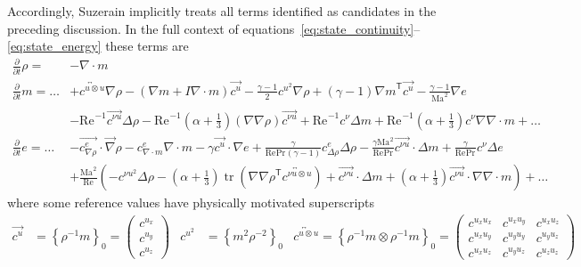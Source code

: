 \documentclass[letterpaper,11pt,nointlimits,reqno,draft]{amsbook}
\newcommand{\trans}[1]{{#1}^{\ensuremath{\mathsf{T}}}}
\newcommand{\Mach}[1][]{\ensuremath{\mbox{Ma}_{#1}}}
\newcommand{\Reynolds}[1][]{\ensuremath{\mbox{Re}_{#1}}}
\newcommand{\Prandtl}[1][]{\ensuremath{\mbox{Pr}_{#1}}}
\newcommand{\reference}[1]{\ensuremath{\left\{#1\right\}_{0}}}
\DeclareMathOperator{\trace}{tr}
\begin{document}
Accordingly, Suzerain implicitly treats all terms identified as candidates
in the preceding discussion.  In the full context of
equations~\eqref{eq:state_continuity}--\eqref{eq:state_energy} these terms are
\begin{align}
  \frac{\partial}{\partial{}t} \rho{} = &-\nabla\cdot{}m
\\
  \frac{\partial}{\partial{}t} m = \dots
   &+ \overleftrightarrow{c^{u\otimes{}u}} \nabla\rho
    - \left(\nabla{}m+I\nabla\cdot{}m\right)\overrightarrow{c^u}
    - \frac{\gamma-1}{2} c^{u^2} \nabla\rho
    + \left(\gamma-1\right)\trans{\nabla{}m} \overrightarrow{c^u}
    - \frac{\gamma-1}{\Mach^2}\nabla{}e
\\
   &- \Reynolds^{-1} \overrightarrow{c^{\nu{}u}} \Delta\rho
    - \Reynolds^{-1} \left(\alpha+\frac{1}{3}\right) \left(\nabla\nabla\rho\right) \overrightarrow{c^{\nu{}u}}
    + \Reynolds^{-1} c^{\nu} \Delta{}m
    + \Reynolds^{-1} \left(\alpha+\frac{1}{3}\right)c^{\nu} \nabla\nabla\cdot{}m
    + \dots
\\
  \frac{\partial}{\partial{}t} e = \dots
   &- \overrightarrow{c^{e}_{\nabla\rho}} \cdot\vec{\nabla}\rho
    - c^{e}_{\nabla\cdot{}m} \nabla\cdot{}m
    - \gamma \overrightarrow{c^u}\cdot\nabla{}e
    + \frac{\gamma}{\Reynolds\Prandtl\left(\gamma-1\right)}
      c^{e}_{\Delta\rho} \Delta\rho
    - \frac{\gamma\Mach^{2}}{\Reynolds\Prandtl}
      \overrightarrow{c^{\nu{}u}}\cdot\Delta{}m
    + \frac{\gamma}{\Reynolds\Prandtl}c^{\nu}\Delta{}e
\\
   &+ \frac{\Mach^2}{\Reynolds}\left(
       - c^{\nu{}u^2}\Delta\rho
       - \left(\alpha+\frac{1}{3}\right)
         \trace\left(\trans{\nabla\nabla\rho}
                     \overleftrightarrow{c^{\nu{}u\otimes{}u}}\right)
       + \overrightarrow{c^{\nu{}u}}\cdot\Delta{}m
       + \left(\alpha+\frac{1}{3}\right)
         \overrightarrow{c^{\nu{}u}}\cdot\nabla\nabla\cdot{}m
   \right)
       + \dots
\end{align}
where some reference values have physically motivated superscripts
\begin{align}
  \overrightarrow{c^{u}} &= \reference{\rho^{-1}m}
  = \begin{pmatrix} c^{u_x} \\ c^{u_y} \\ c^{u_z} \end{pmatrix}
&
  c^{u^2} &= \reference{m^{2}\rho^{-2}}
&
   \overleftrightarrow{c^{u\otimes{}u}}
  = \reference{\rho^{-1}m\otimes\rho^{-1}m}
  = \begin{pmatrix}
   c^{u_x u_x} & c^{u_x u_y} & c^{u_x u_z} \\
   c^{u_x u_y} & c^{u_y u_y} & c^{u_y u_z} \\
   c^{u_x u_z} & c^{u_y u_z} & c^{u_z u_z}
  \end{pmatrix}
\end{align}
\end{document}

